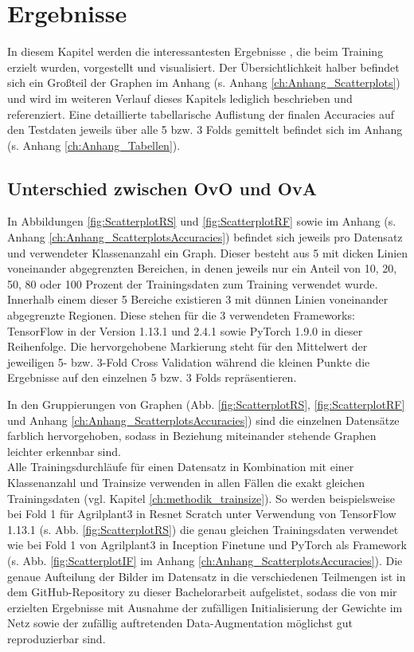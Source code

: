 \chapter{Ergebnisse}
\label{ch:ergebnisse}
In diesem Kapitel werden die interessantesten Ergebnisse \cite{githubRepo}, die beim Training erzielt wurden, vorgestellt und visualisiert. Der Übersichtlichkeit halber befindet sich ein Großteil der Graphen im Anhang (s. Anhang \ref{ch:Anhang_Scatterplots}) und wird im weiteren Verlauf dieses Kapitels lediglich beschrieben und referenziert.
Eine detaillierte tabellarische Auflistung der finalen Accuracies auf den Testdaten jeweils über alle 5 bzw. 3 Folds gemittelt befindet sich im Anhang (s. Anhang \ref{ch:Anhang_Tabellen}).

\section{Unterschied zwischen OvO und OvA}
\label{ch:ergebnisseOvOOvA}
In Abbildungen \ref{fig:ScatterplotRS} und \ref{fig:ScatterplotRF} sowie im Anhang (s. Anhang \ref{ch:Anhang_ScatterplotsAccuracies}) befindet sich jeweils pro Datensatz und verwendeter Klassenanzahl ein Graph. Dieser besteht aus 5 mit dicken Linien voneinander abgegrenzten Bereichen, in denen jeweils nur ein Anteil von 10, 20, 50, 80 oder 100 Prozent der Trainingsdaten zum Training verwendet wurde. Innerhalb einem dieser 5 Bereiche existieren 3 mit dünnen Linien voneinander abgegrenzte Regionen. Diese stehen für die 3 verwendeten Frameworks: TensorFlow \cite{tensorflow} in der Version 1.13.1 und 2.4.1 sowie PyTorch \cite{pytorch} 1.9.0 in dieser Reihenfolge. Die hervorgehobene Markierung steht für den Mittelwert der jeweiligen 5- bzw. 3-Fold Cross Validation während die kleinen Punkte die Ergebnisse auf den einzelnen 5 bzw. 3 Folds repräsentieren.

In den Gruppierungen von Graphen (Abb. \ref{fig:ScatterplotRS}, \ref{fig:ScatterplotRF} und Anhang \ref{ch:Anhang_ScatterplotsAccuracies}) sind die einzelnen Datensätze farblich hervorgehoben, sodass in Beziehung miteinander stehende Graphen leichter erkennbar sind.\\

Alle Trainingsdurchläufe für einen Datensatz in Kombination mit einer Klassenanzahl und Trainsize verwenden in allen Fällen die exakt gleichen Trainingsdaten (vgl. Kapitel \ref{ch:methodik_trainsize}). So werden beispielsweise bei Fold 1 für Agrilplant3 in Resnet Scratch unter Verwendung von TensorFlow 1.13.1 \cite{tensorflow} (s. Abb. \ref{fig:ScatterplotRS}) die genau gleichen Trainingsdaten verwendet wie bei Fold 1 von Agrilplant3 in Inception Finetune und PyTorch \cite{pytorch} als Framework (s. Abb. \ref{fig:ScatterplotIF} im Anhang \ref{ch:Anhang_ScatterplotsAccuracies}). Die genaue Aufteilung der Bilder im Datensatz in die verschiedenen Teilmengen ist in dem GitHub-Repository zu dieser Bachelorarbeit \cite{githubRepo} aufgelistet, sodass die von mir erzielten Ergebnisse mit Ausnahme der zufälligen Initialisierung der Gewichte im Netz sowie der zufällig auftretenden Data-Augmentation möglichst gut reproduzierbar sind.\\

